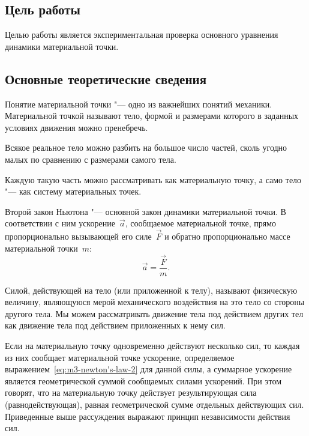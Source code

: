 \documentclass[a4paper, 12pt]{extarticle}
\begin{document}
\MTDTitlePage
\MTDInfoPage

\setcounter{section}{3}

\subsection{Цель работы}
Целью работы является экспериментальная проверка основного уравнения динамики материальной точки.

\subsection{Основные теоретические сведения}

Понятие материальной точки "--- одно из важнейших понятий механики. Материальной точкой называют тело, формой и размерами которого в заданных условиях движения можно пренебречь.

Всякое реальное тело можно разбить на большое число частей, сколь угодно малых по сравнению с размерами самого тела.

Каждую такую часть можно рассматривать как материальную точку, а само тело "--- как систему материальных точек.

Второй закон Ньютона "--- основной закон динамики материальной точки. В соответствии с ним ускорение~$\vec{a}$, сообщаемое материальной точке, прямо пропорционально вызывающей его силе~$\vec{F}$ и обратно пропорционально массе материальной точки~$m$: %
\begin{equation}
\label{eq:m3-newton's-law-2}
\vec{a} = \frac{\vec{F}}{m}.
\end{equation}

Силой, действующей на тело (или приложенной к телу), называют физическую величину, являющуюся мерой механического воздействия на это тело со стороны другого тела. Мы можем рассматривать движение тела под действием других тел как движение тела под действием приложенных к нему сил.

Если на материальную точку одновременно действуют несколько сил, то каждая из них сообщает материальной точке ускорение, определяемое выражением~\eqref{eq:m3-newton's-law-2} для данной силы, а суммарное ускорение является геометрической суммой сообщаемых силами ускорений. При этом говорят, что на материальную точку действует результирующая сила (равнодействующая), равная геометрической сумме отдельных действующих сил. Приведенные выше рассуждения выражают принцип независимости действия сил.
\end{document}
